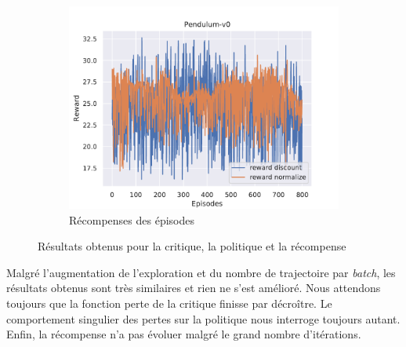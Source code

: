 \begin{figure}[H]
\begin{subfigure}{0.3\textwidth}
    \end{subfigure}
    \begin{subfigure}{0.3\textwidth}
        \includegraphics[width=\textwidth]{figures/iteration4/rewards_Pendulum-v0_pg_dataset_td_eval_True_cycles_800_trajs_200_batches_20_gamma_0.99_nstep_5_lr_act_0.01_lr_critic_0.01.pdf}
        \caption{Récompenses des épisodes}
    \end{subfigure}
    \caption{Résultats obtenus pour la critique, la politique et la récompense}
    \label{fig:itr4_results}
\end{figure}

Malgré l'augmentation de l'exploration et du nombre de trajectoire par \emph{batch}, les résultats obtenus sont très similaires et rien ne s'est amélioré. Nous attendons toujours que la fonction perte de la critique finisse par décroître. Le comportement singulier des pertes sur la politique nous interroge toujours autant. Enfin, la récompense n'a pas évoluer malgré le grand nombre d'itérations.

